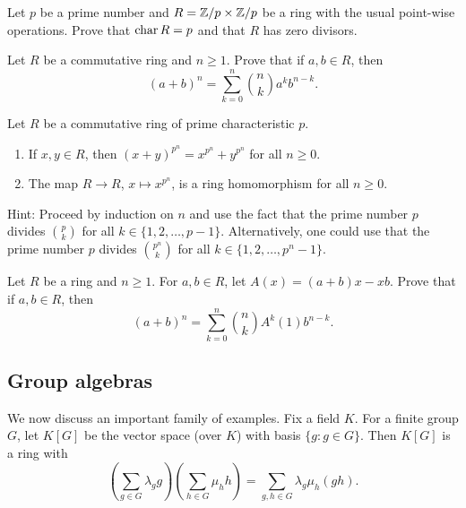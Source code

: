 \begin{exercise}
    Let $p$ be a prime number and 
    $R=\mathbb{Z}/p\times\mathbb{Z}/p$ be a ring with the usual point-wise operations. 
    Prove that $\operatorname{char} R=p$ and that $R$ has zero divisors. 
\end{exercise}

\begin{exercise}
    Let $R$ be a commutative ring and $n\geq1$. Prove that
    if $a,b\in R$, then 
    \[
    (a+b)^n=\sum_{k=0}^n\binom{n}{k}a^kb^{n-k}.
    \]
\end{exercise}    

\begin{exercise}
\label{xca:freshman_dream}
    Let $R$ be a commutative ring of prime characteristic $p$. 
    \begin{enumerate}
        \item If $x,y\in R$, then $(x+y)^{p^n}=x^{p^n}+y^{p^n}$ for all $n\geq0$. 
        \item The map $R\to R$, $x\mapsto x^{p^n}$, is a ring homomorphism for all $n\geq0$.
    \end{enumerate}
\end{exercise}

Hint: Proceed by induction on $n$ and use the fact that the prime number $p$ divides 
$\binom{p}{k}$ for all $k\in\{1,2,\dots,p-1\}$. Alternatively, one could use
that the prime number $p$ divides $\binom{p^n}{k}$ for all 
$k\in\{1,2,\dots,p^n-1\}$. 

\begin{exercise}
    Let $R$ be a ring and $n\geq1$. 
    For $a,b\in R$, let $A(x)=(a+b)x-xb$. 
    Prove that
    if $a,b\in R$, then 
    \[
    (a+b)^n=\sum_{k=0}^n\binom{n}{k}A^k(1)b^{n-k}.
    \] 
\end{exercise}


\subsection{Group algebras}

We now discuss an important family of examples. 
Fix a field $K$. 
For a finite group $G$, let $K[G]$ be the vector space (over $K$)
with basis $\{g:g\in G\}$. Then $K[G]$ is a ring
with
\[
\left(\sum_{g\in G}\lambda_gg\right)\left(\sum_{h\in G}\mu_hh\right)
=\sum_{g,h\in G}\lambda_g\mu_h(gh).
\] 

